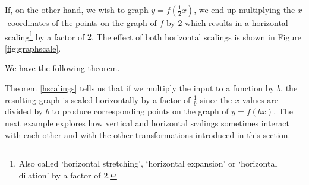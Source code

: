 If, on the other hand, we wish to graph $y = f\left( \frac{1}{2} x\right)$, we end up multiplying the $x$-coordinates of the points on the graph of $f$ by $2$ which results in a horizontal scaling\footnote{Also called `horizontal stretching', `horizontal expansion' or `horizontal dilation' by a factor of $2$.} by a factor of $2$. The effect of both horizontal scalings is shown in Figure \ref{fig:graphscale}.


We have the following theorem.

\medskip


\medskip

Theorem \ref{hscalings} tells us that if we multiply the input to a function by $b$, the resulting graph is scaled horizontally by a factor of $\frac{1}{b}$ since the $x$-values are divided by $b$ to produce corresponding points on the graph of $y = f(bx)$.    The next example explores how vertical and horizontal scalings sometimes interact with each other and with the other transformations introduced in this section. 


